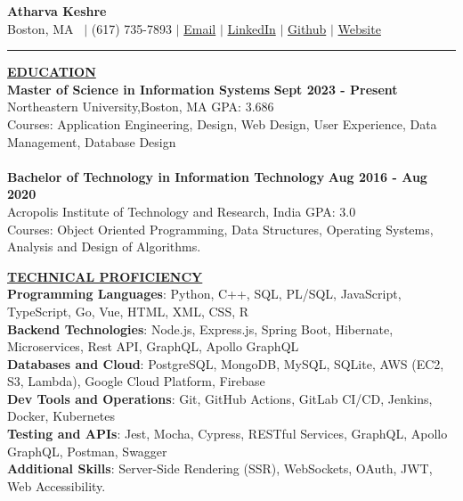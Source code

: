 \documentclass{article}
\begin{document}
\begin{center}
\thispagestyle{empty}
\large \textbf{\textbf{Atharva Keshre}  \\}
\normalsize  Boston, MA   $\mid$ (617) 735-7893 $\mid$ \href{mailto:keshre.a@northeastern.edu}{Email} $\mid$ \href{https://www.linkedin.com/in/atharva-keshre}{LinkedIn} $\mid$  \href{https://github.com/AtharvaKeshre}{Github} $\mid$  \href{https://atharvakeshre08.wixsite.com/website}{Website}  \\
\rule{\textwidth}{1pt}
\end{center}

\noindent \textbf{\underline{EDUCATION}} \\
\textbf{Master of Science in Information Systems} \hfill \textbf{Sept 2023 - Present } \\
Northeastern University,Boston, MA {GPA: 3.686}\\
Courses: Application Engineering, Design, Web Design, User Experience, Data Management, Database Design\\\\
\textbf{Bachelor of Technology in Information Technology} \hfill \textbf{Aug 2016 - Aug 2020 } \\
Acropolis Institute of Technology and Research, India {GPA: 3.0} \\
Courses: Object Oriented Programming, Data Structures, Operating Systems, Analysis and Design of Algorithms.

\vspace{2mm}




\noindent \textbf{\underline{TECHNICAL PROFICIENCY}} \\
\textbf{Programming Languages}: Python, C++, SQL, PL/SQL, JavaScript, TypeScript, Go, Vue, HTML, XML, CSS, R \\
\textbf{Backend Technologies}: Node.js, Express.js, Spring Boot, Hibernate, Microservices, Rest API, GraphQL, Apollo GraphQL \\
\textbf{Databases and Cloud}: PostgreSQL, MongoDB, MySQL, SQLite, AWS (EC2, S3, Lambda), Google Cloud Platform, Firebase \\
\textbf{Dev Tools and Operations}: Git, GitHub Actions, GitLab CI/CD, Jenkins, Docker, Kubernetes \\
\textbf{Testing and APIs}: Jest, Mocha, Cypress, RESTful Services, GraphQL, Apollo GraphQL, Postman, Swagger \\
\textbf{Additional Skills}: Server-Side Rendering (SSR), WebSockets, OAuth, JWT, Web Accessibility.
\end{document}
